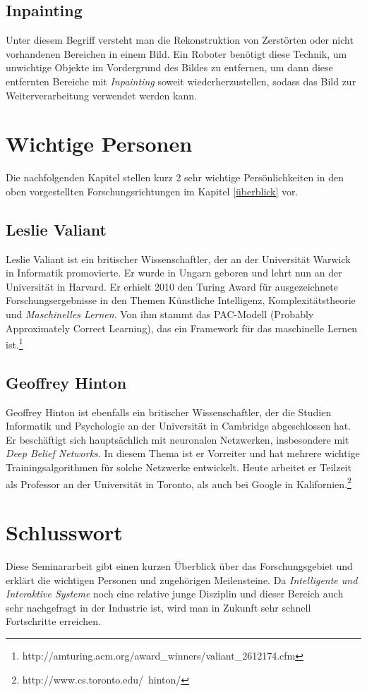 	\subsection{Inpainting}
	Unter diesem Begriff versteht man die Rekonstruktion von Zerstörten oder nicht vorhandenen Bereichen in einem Bild. Ein Roboter benötigt diese Technik, um unwichtige Objekte im Vordergrund des Bildes zu entfernen, um dann diese entfernten Bereiche mit \emph{Inpainting} soweit wiederherzustellen, sodass das Bild zur Weiterverarbeitung verwendet werden kann.
\section{Wichtige Personen}
Die nachfolgenden Kapitel stellen kurz 2 sehr wichtige Persönlichkeiten in den oben vorgestellten Forschungsrichtungen im Kapitel \ref{überblick} vor.
	\subsection{Leslie Valiant}
	Leslie Valiant ist ein britischer Wissenschaftler, der an der Universität Warwick in Informatik promovierte. Er wurde in Ungarn geboren und lehrt nun an der Universität in Harvard. Er erhielt 2010 den Turing Award für ausgezeichnete Forschungsergebnisse in den Themen Künstliche Intelligenz, Komplexitätstheorie und \emph{Maschinelles Lernen}. Von ihm stammt das PAC-Modell (Probably Approximately Correct Learning), das ein Framework für das maschinelle Lernen ist.\footnote{http://amturing.acm.org/award\_winners/valiant\_2612174.cfm}
	\subsection{Geoffrey Hinton}
	Geoffrey Hinton ist ebenfalls ein britischer Wissenschaftler, der die Studien Informatik und Psychologie an der Universität in Cambridge abgeschlossen hat. Er beschäftigt sich hauptsächlich mit neuronalen Netzwerken, insbesondere mit \emph{Deep Belief Networks}. In diesem Thema ist er Vorreiter und hat mehrere wichtige Trainingsalgorithmen für solche Netzwerke entwickelt. Heute arbeitet er Teilzeit als Professor an der Universität in Toronto, als auch bei Google in Kalifornien.\footnote{http://www.cs.toronto.edu/~hinton/}
\section{Schlusswort}
Diese Seminararbeit gibt einen kurzen Überblick über das Forschungsgebiet und erklärt die wichtigen Personen und zugehörigen Meilensteine. Da \emph{Intelligente und Interaktive Systeme} noch eine relative junge Disziplin und dieser Bereich auch sehr nachgefragt in der Industrie ist, wird man in Zukunft sehr schnell Fortschritte erreichen.
